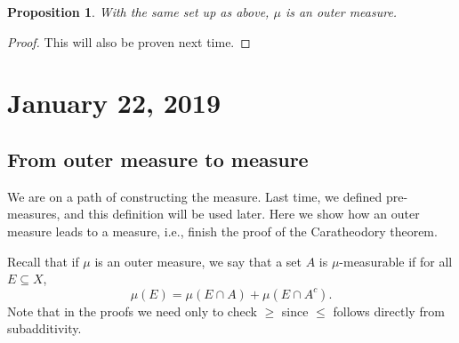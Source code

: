 \documentclass{article}
\newtheorem{proposition}[theorem]{Proposition}
\theoremstyle{definition}
\begin{document}
\begin{proposition}
With the same set up as above, $\mu$ is an outer measure. 
\end{proposition}
\begin{proof}
	This will also be proven next time.
\end{proof}

\section{January 22, 2019}

\subsection{From outer measure to measure}

We are on a path of constructing the measure. 
Last time, we defined pre-measures, and this definition will be used later.
Here we show how an outer measure leads to a measure,
i.e., finish the proof of the Caratheodory theorem.

Recall that if $\mu$ is an outer measure, 
we say that a set \( A \) is
\(\mu\)-measurable if for all \( E \subseteq X \),
\begin{displaymath}
	\mu(E) = \mu(E \cap A) + \mu(E \cap A^c).
\end{displaymath}
Note that in the proofs we need only to check \( \geq \) since \( \leq \) follows directly
from subadditivity.
\end{document}
